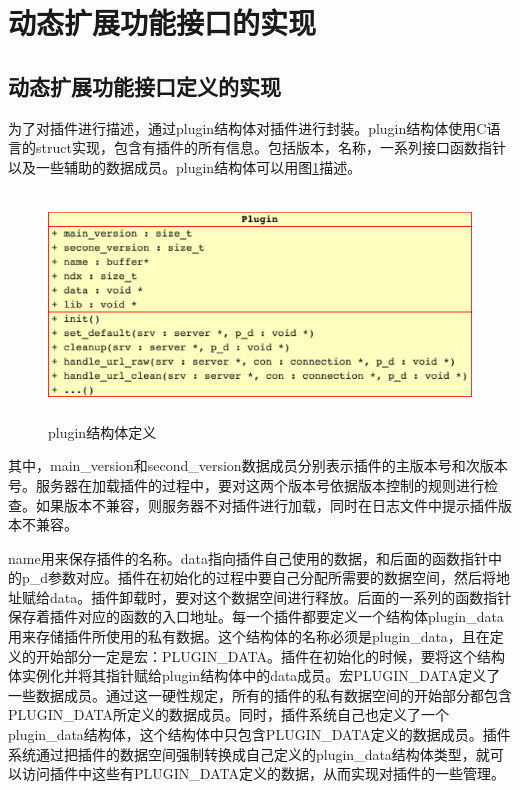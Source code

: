 \documentclass[12pt, twoside, a4paper, xetex]{report}
\begin{document}
\section{动态扩展功能接口的实现}

\subsection{动态扩展功能接口定义的实现}
	为了对插件进行描述，通过plugin结构体对插件进行封装。plugin结构体使用C语言的struct实现，包含有插件的所有信息。包括版本，名称，一系列接口函数指针以及一些辅助的数据成员。plugin结构体可以用图\ref{plugin_s}描述。
	
	\begin{figure}[htbp]
	\centering
	\caption{plugin结构体定义}
	\label{plugin_s}
	\includegraphics[height=6cm, width=12cm]{pics/plugin_s.eps}
	\end{figure}
	
	其中，main\_version和second\_version数据成员分别表示插件的主版本号和次版本号。服务器在加载插件的过程中，要对这两个版本号依据版本控制的规则进行检查。如果版本不兼容，则服务器不对插件进行加载，同时在日志文件中提示插件版本不兼容。
	
	name用来保存插件的名称。data指向插件自己使用的数据，和后面的函数指针中的p\_d参数对应。插件在初始化的过程中要自己分配所需要的数据空间，然后将地址赋给data。插件卸载时，要对这个数据空间进行释放。后面的一系列的函数指针保存着插件对应的函数的入口地址。每一个插件都要定义一个结构体plugin\_data用来存储插件所使用的私有数据。这个结构体的名称必须是plugin\_data，且在定义的开始部分一定是宏：PLUGIN\_DATA。插件在初始化的时候，要将这个结构体实例化并将其指针赋给plugin结构体中的data成员。宏PLUGIN\_DATA定义了一些数据成员。通过这一硬性规定，所有的插件的私有数据空间的开始部分都包含PLUGIN\_DATA所定义的数据成员。同时，插件系统自己也定义了一个plugin\_data结构体，这个结构体中只包含PLUGIN\_DATA定义的数据成员。插件系统通过把插件的数据空间强制转换成自己定义的plugin\_data结构体类型，就可以访问插件中这些有PLUGIN\_DATA定义的数据，从而实现对插件的一些管理。
	
\end{document}
